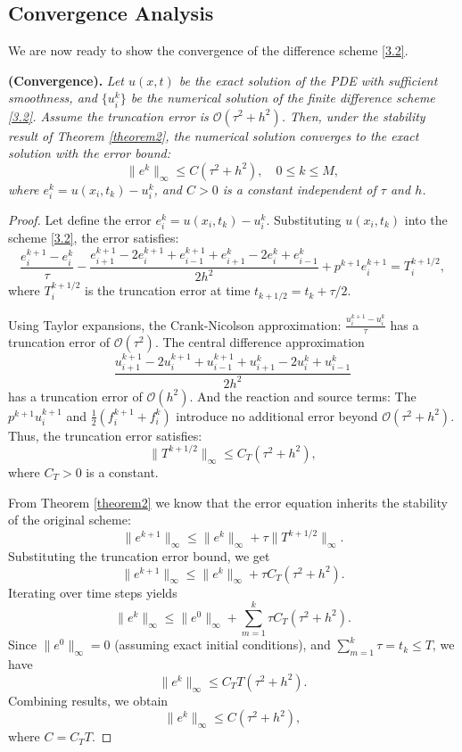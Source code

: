 \documentclass[reqno]{amsart}
\begin{document}
\subsection{Convergence Analysis}
We are now ready to show the convergence of the difference scheme \eqref{3.2}.
\begin{theorem}\label{theorem3}
\textbf{(Convergence).} \textit{Let \(u(x,t)\) be the exact solution of the PDE with sufficient smoothness, and \(\{u_i^k\}\) be the numerical solution of the finite difference scheme \eqref{3.2}. Assume the truncation error is \(\mathcal{O}(\tau^2 + h^2)\). Then, under the stability result of Theorem \ref{theorem2}, the numerical solution converges to the exact solution with the error bound:}
\[
\|e^{k}\|_\infty \leq C \left(\tau^2 + h^2\right), \quad 0 \leq k \leq M,
\]
\textit{where \(e_i^k = u(x_i, t_k) - u_i^k\), and \(C > 0\) is a constant independent of \(\tau\) and \(h\).}
\end{theorem} 

\begin{proof} Let define the error \(e_i^k = u(x_i, t_k) - u_i^k\). Substituting \(u(x_i, t_k)\) into the scheme \eqref{3.2}, the error satisfies:
\[
\frac{e_i^{k+1} - e_i^{k}}{\tau} - \frac{e_{i+1}^{k+1} - 2e_i^{k+1} + e_{i-1}^{k+1} + e_{i+1}^{k} - 2e_i^{k} + e_{i-1}^{k}}{2h^2} + p^{k+1} e_i^{k+1} = T_i^{k+1/2},
\]
where \(T_i^{k+1/2}\) is the truncation error at time \(t_{k+1/2} = t_k + \tau/2\).

Using Taylor expansions, the Crank-Nicolson approximation: \(\frac{u_i^{k+1} - u_i^k}{\tau}\) has a truncation error of \(\mathcal{O}(\tau^2)\). The central difference approximation \\
\[
\frac{u_{i+1}^{k+1} - 2u_i^{k+1} + u_{i-1}^{k+1} + u_{i+1}^k - 2u_i^k + u_{i-1}^k}{2h^2}
\]
has a truncation error of \(\mathcal{O}(h^2)\).
And the reaction and source terms: The  \(p^{k+1} u_i^{k+1}\) and \(\frac{1}{2}(f_i^{k+1} + f_i^k)\) introduce no additional error beyond \(\mathcal{O}(\tau^2 + h^2)\).
Thus, the truncation error satisfies:
\[
\|T^{k+1/2}\|_\infty \leq C_T (\tau^2 + h^2),
\]
where \(C_T > 0\) is a constant.

From Theorem \ref{theorem2} we know  that the error equation inherits the stability of the original scheme:
\[
\|e^{k+1}\|_\infty \leq \|e^k\|_\infty + \tau \|T^{k+1/2}\|_\infty.
\]
Substituting the truncation error bound, we get
\[
\|e^{k+1}\|_\infty \leq \|e^k\|_\infty + \tau C_T (\tau^2 + h^2).
\]
Iterating over time steps yields
\[
\|e^{k}\|_\infty \leq \|e^0\|_\infty + \sum_{m=1}^k \tau C_T (\tau^2 + h^2).
\]
Since \(\|e^0\|_\infty = 0\) (assuming exact initial conditions), and \(\sum_{m=1}^k \tau = t_k \leq T\), we have
\[
\|e^{k}\|_\infty \leq C_T T (\tau^2 + h^2).
\]
Combining results, we obtain
\[
\|e^{k}\|_\infty \leq C (\tau^2 + h^2),
\]
where \(C = C_T T\). 
\end{proof}
\end{document}
